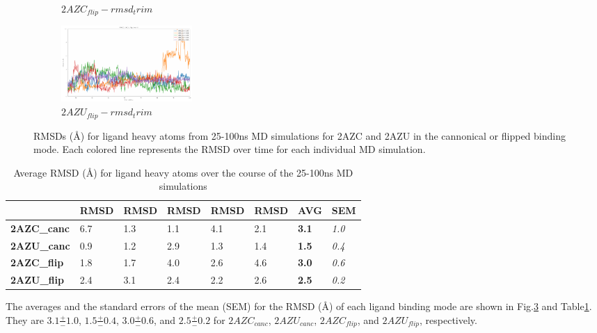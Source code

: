 \begin{figure}[!ht]
\begin{subfigure}{.45\textwidth}
     \caption{$2AZC_{flip}-rmsd_trim$}
     \label{fig:2AZC_flip-rmsd_trim}
   \end{subfigure}
    \begin{subfigure}{.45\textwidth}
     \centering
     \includegraphics[width=.95\linewidth]{chapter4/2AZU_flip/2AZU_flip-rmsd-trim}
     \caption{$2AZU_{flip}-rmsd_trim$}
     \label{fig:2AZU_flip-rmsd_trim}
   \end{subfigure}
\caption{RMSDs ({\AA}) for ligand heavy atoms from 25-100ns MD simulations for 2AZC and 2AZU in the cannonical or flipped binding mode. Each colored line represents the RMSD over time for each individual MD simulation.}
\label{fig:rmsd}
\end{figure}  

\begin{table}[!ht]
\caption{Average RMSD ({\AA}) for ligand heavy atoms over the course of the 25-100ns MD simulations}
\label{table:rmsd}
\begin{tabular}{|l|l|l|l|l|l|l|l|}
\hline
                    & RMSD & RMSD & RMSD & RMSD & RMSD & \textbf{AVG}  & SEM           \\ \hline
\textbf{2AZC\_canc} & 6.7 & 1.3 & 1.1 & 4.1 & 2.1 & \textbf{3.1} & \textit{1.0} \\ \hline
\textbf{2AZU\_canc} & 0.9 & 1.2 & 2.9 & 1.3 & 1.4 & \textbf{1.5} & \textit{0.4} \\ \hline
\textbf{2AZC\_flip} & 1.8 & 1.7 & 4.0 & 2.6 & 4.6 & \textbf{3.0} & \textit{0.6} \\ \hline
\textbf{2AZU\_flip} & 2.4 & 3.1 & 2.4 & 2.2 & 2.6 & \textbf{2.5} & \textit{0.2} \\ \hline

\end{tabular}
\end{table}

The averages and the standard errors of the mean (SEM) for the RMSD ({\AA}) of each ligand binding mode are shown in Fig.\ref{fig:rmsd} and Table\ref{table:rmsd}.
They are $3.1 \frac{+}{-} 1.0$, $1.5 \frac{+}{-} 0.4$, $3.0 \frac{+}{-} 0.6$, and $2.5 \frac{+}{-} 0.2$ for $2AZC_{canc}$, $2AZU_{canc}$, $2AZC_{flip}$, and $2AZU_{flip}$, respectively.

